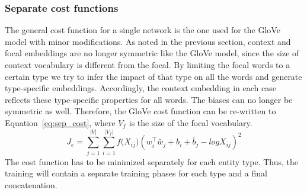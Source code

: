 \subsubsection{Separate cost functions}
\label{sec:normal_cost}

The general cost function for a single network is the one used for the GloVe model with minor modifications.
As noted in the previous section, context and focal embeddings are no longer symmetric like the GloVe model, since the size of context vocabulary is different from the focal. 
By limiting the focal words to a certain type we try to infer the impact of that type on all the words and generate type-specific embeddings. Accordingly, the context embedding in each case reflects these type-specific properties for all words. The biases can no longer be symmetric as well. Therefore, the GloVe cost function can be re-written to Equation~\ref{eq:sep_cost}, where $V_f$ is the size of the focal vocabulary.
\begin{equation}
J_e=\sum _{ j=1 }^{ |V| }{}\sum _{ i=1 }^{ |V_f| }{ f({ X }_{ ij } } )(w_{ i }^{ \top }\tilde{  w_{ j } } +b_{ i }+\tilde{  b_{ j } } -log{ X }_{ ij })^2
\label{eq:sep_cost}
\end{equation}
The cost function has to be minimized separately for each entity type. Thus, the training will contain a separate training phases for each type and a final concatenation. 
